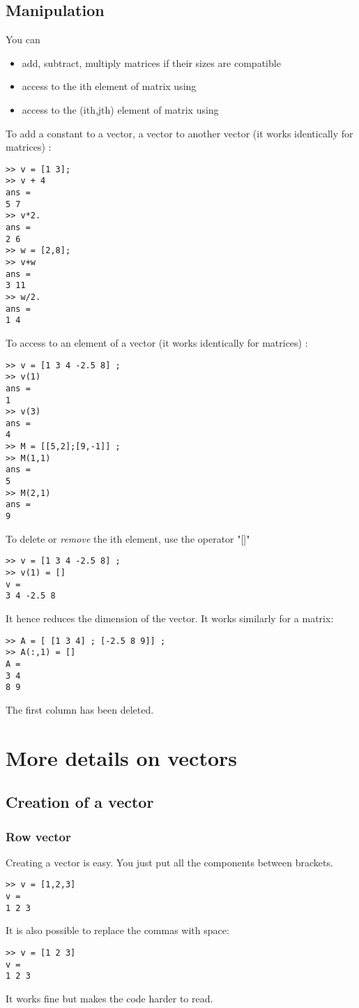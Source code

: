 	\subsection{Manipulation}
		You can
		\begin{itemize}
			\item add, subtract, multiply matrices if their sizes are compatible
			\item access to the ith element of matrix  using 
			\item access to the (ith,jth) element of matrix  using 
		\end{itemize}	
		To add a constant to a vector, a vector to another vector (it works identically for matrices) :
\begin{lstlisting}
>> v = [1 3];
>> v + 4
ans =
5 7
>> v*2.
ans =
2 6
>> w = [2,8];
>> v+w
ans =
3 11
>> w/2.
ans =
1 4
\end{lstlisting}
		To access to an element of a vector  (it works identically for matrices) :
\begin{lstlisting}
>> v = [1 3 4 -2.5 8] ;
>> v(1)
ans = 
1
>> v(3)
ans = 
4
>> M = [[5,2];[9,-1]] ;
>> M(1,1)
ans =
5
>> M(2,1)
ans =
9
\end{lstlisting}
		To delete or \emph{remove} the ith element, use the operator "[]"
\begin{lstlisting}
>> v = [1 3 4 -2.5 8] ;
>> v(1) = []
v = 
3 4 -2.5 8
\end{lstlisting}
		It hence reduces the dimension of the vector. It works similarly for a matrix:
\begin{lstlisting}
>> A = [ [1 3 4] ; [-2.5 8 9]] ;
>> A(:,1) = []
A = 
3 4
8 9
\end{lstlisting}
		The first column has been deleted.



\section{More details on vectors}
	\subsection{Creation of a vector}
		\subsubsection{Row vector}
			Creating a vector  is easy. You just put all the components between brackets.
\begin{lstlisting}
>> v = [1,2,3]
v =
1 2 3
\end{lstlisting}
			It is also possible to replace the commas with space:
\begin{lstlisting}
>> v = [1 2 3]
v =
1 2 3
\end{lstlisting}
			It works fine but makes the code harder to read.
			
